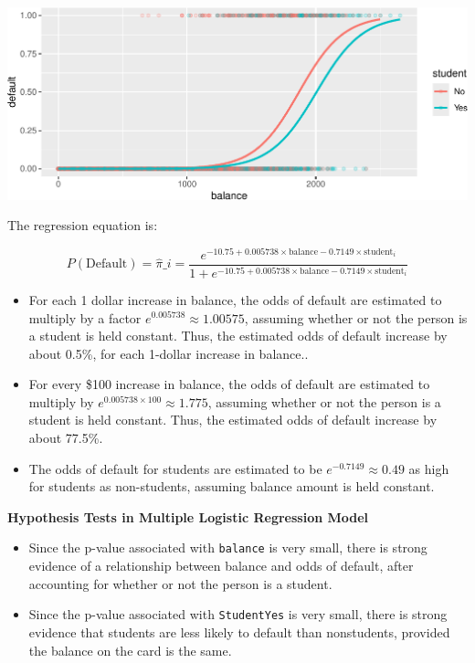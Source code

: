 \documentclass[
  letterpaper,
  DIV=11,
  numbers=noendperiod]{scrreprt}
\begin{document}
\includegraphics{Ch6_files/figure-pdf/unnamed-chunk-17-1.pdf}

The regression equation is:

\[
P(\text{Default}) = \hat{\pi}\_i = \frac{e^{-10.75+0.005738\times\text{balance}-0.7149\times\text{student}_i}}{1+e^{-10.75+0.005738\times\text{balance}-0.7149\times\text{student}_i}}
\]

\begin{itemize}
\item
  For each 1 dollar increase in balance, the odds of default are
  estimated to multiply by a factor \(e^{0.005738}\approx 1.00575\),
  assuming whether or not the person is a student is held constant.
  Thus, the estimated odds of default increase by about 0.5\%, for each
  1-dollar increase in balance..
\item
  For every \$100 increase in balance, the odds of default are estimated
  to multiply by \(e^{0.005738\times100}\approx 1.775\), assuming
  whether or not the person is a student is held constant. Thus, the
  estimated odds of default increase by about 77.5\%.
\item
  The odds of default for students are estimated to be
  \(e^{-0.7149} \approx 0.49\) as high for students as non-students,
  assuming balance amount is held constant.
\end{itemize}

\textbf{Hypothesis Tests in Multiple Logistic Regression Model}

\begin{itemize}
\item
  Since the p-value associated with \texttt{balance} is very small,
  there is strong evidence of a relationship between balance and odds of
  default, after accounting for whether or not the person is a student.
\item
  Since the p-value associated with \texttt{StudentYes} is very small,
  there is strong evidence that students are less likely to default than
  nonstudents, provided the balance on the card is the same.
\end{itemize}
\end{document}
